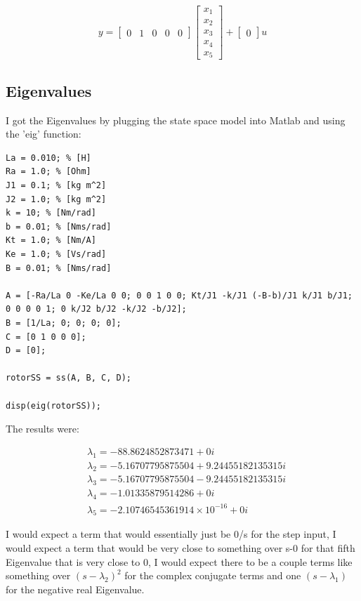 \documentclass{article}
\begin{document}
\[
y =
\begin{bmatrix}
0 & 1 & 0 & 0 & 0
\end{bmatrix}
\begin{bmatrix}
x_1 \\
x_2 \\
x_3 \\
x_4 \\
x_5
\end{bmatrix}
+
\begin{bmatrix}
0
\end{bmatrix}
u
\]

\subsection*{Eigenvalues}

I got the Eigenvalues by plugging the state space model into Matlab and using the 'eig' function:

\begin{lstlisting}[style=matlabstyle]
La = 0.010; % [H]
Ra = 1.0; % [Ohm]
J1 = 0.1; % [kg m^2]
J2 = 1.0; % [kg m^2]
k = 10; % [Nm/rad]
b = 0.01; % [Nms/rad]
Kt = 1.0; % [Nm/A]
Ke = 1.0; % [Vs/rad]
B = 0.01; % [Nms/rad]

A = [-Ra/La 0 -Ke/La 0 0; 0 0 1 0 0; Kt/J1 -k/J1 (-B-b)/J1 k/J1 b/J1; 0 0 0 0 1; 0 k/J2 b/J2 -k/J2 -b/J2]; 
B = [1/La; 0; 0; 0; 0];       
C = [0 1 0 0 0];        
D = [0];  

rotorSS = ss(A, B, C, D);

disp(eig(rotorSS));    
\end{lstlisting}

The results were:

\[
\begin{aligned}
&\lambda_1 = -88.8624852873471 + 0i \\
&\lambda_2 = -5.16707795875504 + 9.24455182135315i \\
&\lambda_3 = -5.16707795875504 - 9.24455182135315i \\
&\lambda_4 = -1.01335879514286 + 0i \\
&\lambda_5 = -2.10746545361914 \times 10^{-16} + 0i
\end{aligned}
\]

I would expect a term that would essentially just be 0/s for the step input, I would expect a term that would be very close to something over s-0 for that fifth Eigenvalue that is very close to 0, I would expect there to be a couple terms like something over $(s-\lambda_2)^2$ for the complex conjugate terms and one $(s-\lambda_1)$ for the negative real Eigenvalue.
\end{document}
